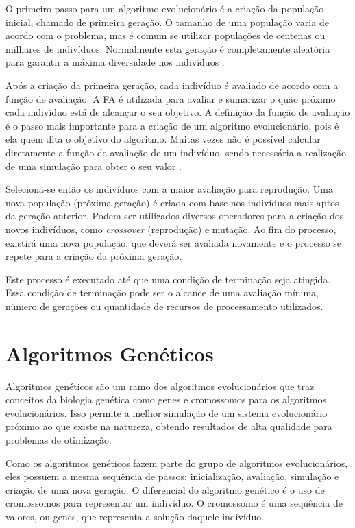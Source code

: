\documentclass[12pt,oneside,a4paper,english,french,spanish,brazil,]{abntex2}
\begin{document}
O primeiro passo para um algoritmo evolucionário é a criação da população inicial, chamado de primeira geração. O tamanho de uma população varia de acordo com o problema, mas é comum se utilizar populações de centenas ou milhares de indivíduos. Normalmente esta geração é completamente aleatória para garantir a máxima diversidade nos indivíduos \cite{linden:2008}.

Após a criação da primeira geração, cada indivíduo é avaliado de acordo com a função de avaliação. A FA é utilizada para avaliar e sumarizar o quão próximo cada indivíduo está de alcançar o seu objetivo. A definição da função de avaliação é o passo mais importante para a criação de um algoritmo evolucionário, pois é ela quem dita o objetivo do algoritmo. Muitas vezes não é possível calcular diretamente a função de avaliação de um indivíduo, sendo necessária a realização de uma simulação para obter o seu valor \cite{linden:2008}.

Seleciona-se então os indivíduos com a maior avaliação para reprodução. Uma nova população (próxima geração) é criada com base nos indivíduos mais aptos da geração anterior. Podem ser utilizados diversos operadores para a criação dos novos indivíduos, como \textit{crossover} (reprodução) e mutação. Ao fim do processo, existirá uma nova população, que deverá ser avaliada novamente e o processo se repete para a criação da próxima geração.

Este processo é executado até que uma condição de terminação seja atingida. Essa condição de terminação pode ser o alcance de uma avaliação mínima, número de gerações ou quantidade de recursos de processamento utilizados.

\section{Algoritmos Genéticos}

Algoritmos genéticos são um ramo dos algoritmos evolucionários que traz conceitos da biologia genética como genes e cromossomos para os algoritmos evolucionários. Isso permite a melhor simulação de um sistema evolucionário próximo ao que existe na natureza, obtendo resultados de alta qualidade para problemas de otimização.

Como os algoritmos genéticos fazem parte do grupo de algoritmos evolucionários, eles possuem a mesma sequência de passos: inicialização, avaliação, simulação e criação de uma nova geração. O diferencial do algoritmo genético é o uso de cromossomos para representar um indivíduo. O cromossomo é uma sequência de valores, ou genes, que representa a solução daquele indivíduo.
\end{document}
